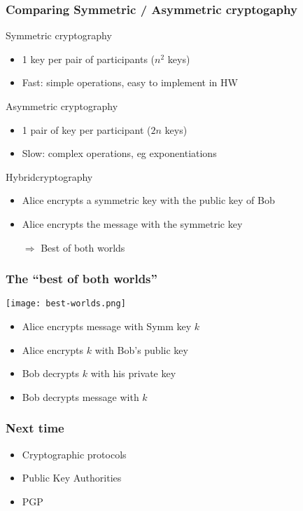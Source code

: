 \documentclass[
hyperref={pdfpagelabels=false}
,xcolor=table
]
{beamer}
\begin{document}
\begin{frame}
  \frametitle{Comparing Symmetric / Asymmetric cryptogaphy}

  \begin{block}{Symmetric cryptography}
    \begin{itemize}
    \item 1 key per pair of participants ($n^2$ keys)
    \item Fast: simple operations, easy to implement in HW
    \end{itemize}
  \end{block}

  \begin{block}{Asymmetric cryptography}
    \begin{itemize}
    \item 1 pair of key per participant ($2n$ keys)
    \item Slow: complex operations, eg exponentiations
    \end{itemize}
  \end{block}


  \begin{block}{Hybridcryptography}
    \begin{itemize}
    \item Alice encrypts a symmetric key with the public key of Bob
    \item Alice encrypts the message with the symmetric key
    \item[$\Rightarrow$] Best of both worlds
    \end{itemize}
  \end{block}
  
\end{frame}


\begin{frame}
  \frametitle{The ``best of both worlds''}

  \begin{center}
    \texttt{[image: best-worlds.png]}
  \end{center}

  
  \begin{itemize}
  \item Alice encrypts message with Symm key $k$
  \item Alice encrypts $k$ with Bob's public key
  \item Bob decrypts $k$ with his private key
  \item Bob decrypts message with $k$
  \end{itemize}
  
\end{frame}

\begin{frame}
  \frametitle{Next time}

  \begin{itemize}
  \item Cryptographic protocols
  \item Public Key Authorities
  \item PGP
  \end{itemize}
\end{frame}
\end{document}
